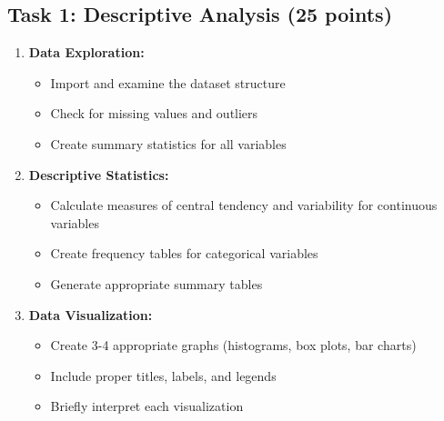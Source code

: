 \documentclass[11pt]{article}
\begin{document}
\subsection{Task 1: Descriptive Analysis (25 points)}
\begin{enumerate}
\item \textbf{Data Exploration:}
   \begin{itemize}
   \item Import and examine the dataset structure
   \item Check for missing values and outliers
   \item Create summary statistics for all variables
   \end{itemize}

\item \textbf{Descriptive Statistics:}
   \begin{itemize}
   \item Calculate measures of central tendency and variability for continuous variables
   \item Create frequency tables for categorical variables
   \item Generate appropriate summary tables
   \end{itemize}

\item \textbf{Data Visualization:}
   \begin{itemize}
   \item Create 3-4 appropriate graphs (histograms, box plots, bar charts)
   \item Include proper titles, labels, and legends
   \item Briefly interpret each visualization
   \end{itemize}
\end{enumerate}
\end{document}
